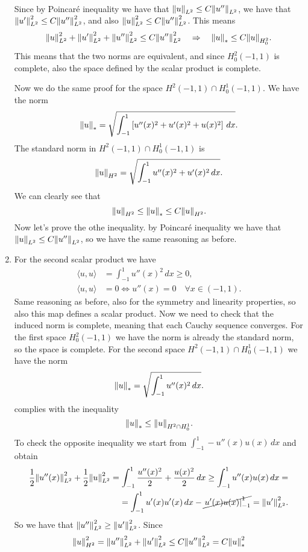 \begin{enumerate}
\[\begin{split}
        \end{split}
    \]
    Since by Poincaré inequality we have that \(\norm{u}_{L^2} \leq C \norm{u''}_{L^2}\), we have that \(\norm{u'}_{L^2}^2 \leq C \norm{u''}_{L^2}^2\), and also \(\norm{u}_{L^2}^2 \leq C \norm{u''}_{L^2}^2\). 
    This means
    \[
        \norm{u}_{L^2}^2 + \norm{u'}_{L^2}^2 + \norm{u''}_{L^2}^2 \leq C \norm{u''}_{L^2}^2 \quad \Rightarrow \quad \norm{u}_* \leq C \norm{u}_{H^2_0}.
    \]
    This means that the two norms are equivalent, and since \(H^2_0(-1, 1)\) is complete, also the space defined by the scalar product is complete.
    
    Now we do the same proof for the space \(H^2(-1, 1) \cap H^1_0(-1, 1)\). We have the norm
    \[
        \norm{u}_* = \sqrt{\int_{-1}^1 \left[ u''(x)^2 + u'(x)^2 + u(x)^2 \right] \, dx}.
    \]
    The standard norm in \(H^2(-1, 1) \cap H^1_0(-1, 1)\) is
    \[
        \norm{u}_{H^2} = \sqrt{\int_{-1}^1 u''(x)^2 + u'(x)^2 \, dx}.
    \]
    We can clearly see that
    \[
        \norm{u}_{H^2} \leq \norm{u}_* \leq C \norm{u}_{H^2}.
    \]
    Now let's prove the othe inequality. by Poincaré inequality we have that \(\norm{u}_{L^2} \leq C \norm{u''}_{L^2}\), so we have
    the same reasoning as before.
    \item For the second scalar product we have
    \[
        \begin{aligned}
            \langle u, u \rangle &= \int_{-1}^1 u''(x)^2 \, dx \geq 0, \\
            \langle u, u \rangle &= 0 \iff u''(x) = 0 \quad \forall x \in (-1, 1).
        \end{aligned}
    \]
    Same reasoning as before, also for the symmetry and linearity properties, so also this map defines a scalar product.
    Now we need to check that the induced norm is complete, meaning that each Cauchy sequence converges. For the first space \(H^2_0(-1, 1)\) we have the norm is already the standard norm, so the space is complete. For the second space \(H^2(-1, 1) \cap H^1_0(-1, 1)\) we have the norm
    \[
        \norm{u}_* = \sqrt{\int_{-1}^1 u''(x)^2 \, dx}.
    \]
    complies with the inequality
    \[
        \norm{u}_* \leq \norm{u}_{H^2\cap H^1_0}.
    \]
    To check the opposite inequality we start from \(\int_{-1}^1 -u''(x) u (x) \, dx \) and obtain
    \[
        \begin{split}
            \frac{1}{2} \norm{u''(x)}^2_{L^2} + \frac{1}{2} \norm{u}^2_{L^2} = \int_{-1}^1 \frac{u''(x)^2}{2} + \frac{u(x)^2}{2} \, dx \geq \int_{-1}^1 u''(x) u(x) \, dx =\\= \int_{-1}^1 u'(x) u'(x) \, dx - \cancel{\left. u'(x) u(x) \right|_{-1}^1} = \norm{u'}^2_{L^2}.
        \end{split}
    \]
    So we have that \(\norm{u''}_{L^2}^2 \geq \norm{u'}_{L^2}^2\). Since 
    \[
        \norm{u}_{H^2}^2 = \norm{u''}_{L^2}^2 + \norm{u'}_{L^2}^2 \leq C \norm{u''}_{L^2}^2 = C \norm{u}_*^2
    \]


\end{enumerate}
